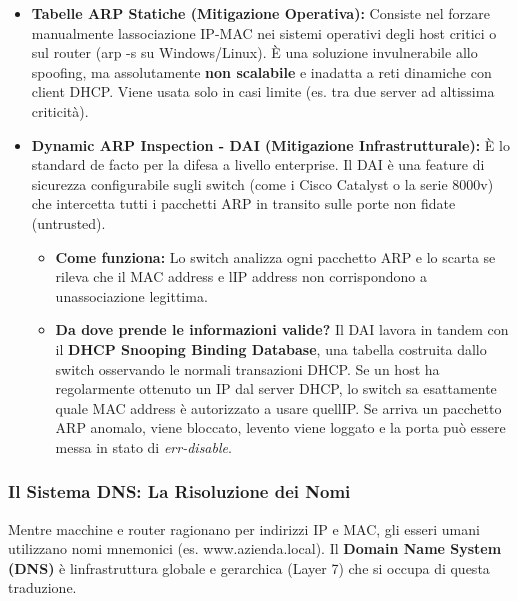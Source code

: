 \documentclass[11pt,a4paper]{article}
\begin{document}
\begin{itemize}
\item
  \textbf{Tabelle ARP Statiche (Mitigazione Operativa):} Consiste nel
  forzare manualmente l\textquotesingle associazione IP-MAC nei sistemi
  operativi degli host critici o sul router (arp -s su Windows/Linux). È
  una soluzione invulnerabile allo spoofing, ma assolutamente
  \textbf{non scalabile} e inadatta a reti dinamiche con client DHCP.
  Viene usata solo in casi limite (es. tra due server ad altissima
  criticità).
\item
  \textbf{Dynamic ARP Inspection - DAI (Mitigazione Infrastrutturale):}
  È lo standard de facto per la difesa a livello enterprise. Il DAI è
  una feature di sicurezza configurabile sugli switch (come i Cisco
  Catalyst o la serie 8000v) che intercetta tutti i pacchetti ARP in
  transito sulle porte non fidate (untrusted).

  \begin{itemize}
  \item
    \textbf{Come funziona:} Lo switch analizza ogni pacchetto ARP e lo
    scarta se rileva che il MAC address e l\textquotesingle IP address
    non corrispondono a un\textquotesingle associazione legittima.
  \item
    \textbf{Da dove prende le informazioni valide?} Il DAI lavora in
    tandem con il \textbf{DHCP Snooping Binding Database}, una tabella
    costruita dallo switch osservando le normali transazioni DHCP. Se un
    host ha regolarmente ottenuto un IP dal server DHCP, lo switch sa
    esattamente quale MAC address è autorizzato a usare
    quell\textquotesingle IP. Se arriva un pacchetto ARP anomalo, viene
    bloccato, l\textquotesingle evento viene loggato e la porta può
    essere messa in stato di \emph{err-disable}.
  \end{itemize}
\end{itemize}

\subsubsection{Il Sistema DNS: La Risoluzione dei
Nomi}\label{il-sistema-dns-la-risoluzione-dei-nomi}

Mentre macchine e router ragionano per indirizzi IP e MAC, gli esseri
umani utilizzano nomi mnemonici (es. www.azienda.local). Il
\textbf{Domain Name System (DNS)} è l\textquotesingle infrastruttura
globale e gerarchica (Layer 7) che si occupa di questa traduzione.
\end{document}
